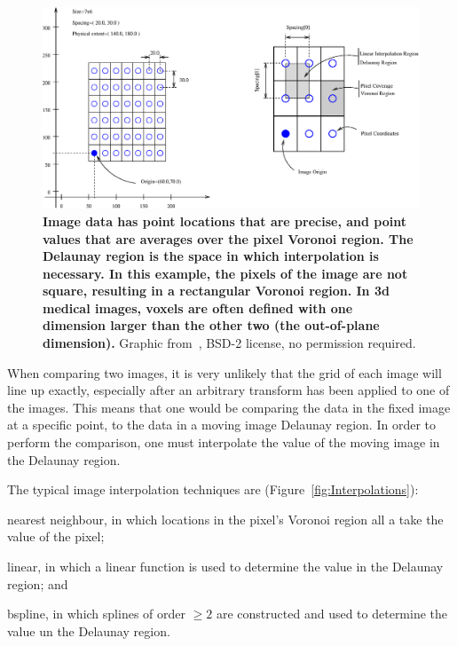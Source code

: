 \begin{figure}
\centering
\includegraphics[width=\linewidth]{./appendixDvc/figures/SoftwareGuide-Art-ImageOriginAndSpacing}
\caption[Image data representation]{\textbf{Image data has point locations that are precise, and point values that are averages over the pixel Voronoi region. The Delaunay region is the space in which interpolation is necessary. In this example, the pixels of the image are not square, resulting in a rectangular Voronoi region. In \acs{3d} medical images, voxels are often defined with one dimension larger than the other two (the out-of-plane dimension).} Graphic from~\citet{ibanez_imageoriginandspacing.fig_2003}, BSD-2 license, no permission required.}
\label{fig:ImageData}
\end{figure}

When comparing two images, it is very unlikely that the grid of each image will line up exactly, especially after an arbitrary transform has been applied to one of the images.
This means that one would be comparing the data in the fixed image at a specific point, to the data in a moving image Delaunay region.
In order to perform the comparison, one must interpolate the value of the moving image in the Delaunay region.

The typical image interpolation techniques are (Figure~\ref{fig:Interpolations}):
\begin{inparaenum}[(i)]
\item  nearest neighbour, in which locations in the pixel's Voronoi region all a take the value of the pixel;
\item linear, in which a linear function is used to determine the value in the Delaunay region; and
\item \ac{bspline}, in which splines of order $\geq2$ are constructed and used to determine the value un the Delaunay region.
\end{inparaenum}

